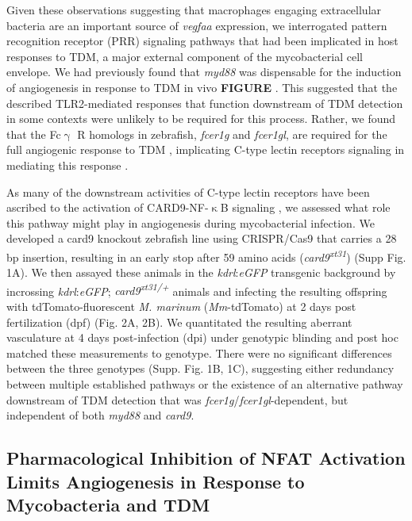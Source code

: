 Given these observations suggesting that macrophages engaging extracellular bacteria are an important source of \textit{vegfaa} expression, we interrogated pattern recognition receptor (PRR) signaling pathways that had been implicated in host responses to TDM, a major external component of the mycobacterial cell envelope. We had previously found that \textit{myd88} was dispensable for the induction of angiogenesis in response to TDM in vivo \textbf{FIGURE} \citep{Bowdish2009, Walton2018}. This suggested that the described TLR2-mediated responses that function downstream of TDM detection in some contexts were unlikely to be required for this process. Rather, we found that the Fc$\upgamma$ R homologs in zebrafish, \textit{fcer1g} and \textit{fcer1gl}, are required for the full angiogenic response to TDM \citep{Walton2018}, implicating C-type lectin receptors signaling in mediating this response \citep{Richardson2014, Zhao2014}.

As many of the downstream activities of C-type lectin receptors have been ascribed to the activation of CARD9-NF-$\upkappa$B signaling \citep{Goodridge2009, LobatoPascual2013, Zhao2014, Williams2017, Deerhake2021}, we assessed what role this pathway might play in angiogenesis during mycobacterial infection. We developed a card9 knockout zebrafish line using CRISPR/Cas9 that carries a 28 bp insertion, resulting in an early stop after 59 amino acids (\textit{card9\textsuperscript{xt31}}) (Supp Fig. 1A). We then assayed these animals in the \textit{kdrl}:\textit{eGFP} transgenic background by incrossing \textit{kdrl}:\textit{eGFP}; \textit{card9\textsuperscript{xt31/+}} animals and infecting the resulting offspring with tdTomato-fluorescent \textit{M. marinum} (\textit{Mm}-tdTomato) at 2 days post fertilization (dpf) \citep{Jin2005, Oehlers2015}(Fig. 2A, 2B). We quantitated the resulting aberrant vasculature at 4 days post-infection (dpi) under genotypic blinding and post hoc matched these measurements to genotype. There were no significant differences between the three genotypes (Supp. Fig. 1B, 1C), suggesting either redundancy between multiple established pathways or the existence of an alternative pathway downstream of TDM detection that was \textit{fcer1g}/\textit{fcer1gl}-dependent, but independent of both \textit{myd88} and \textit{card9}. 

\subsection{Pharmacological Inhibition of NFAT Activation Limits Angiogenesis in Response to Mycobacteria and TDM}

